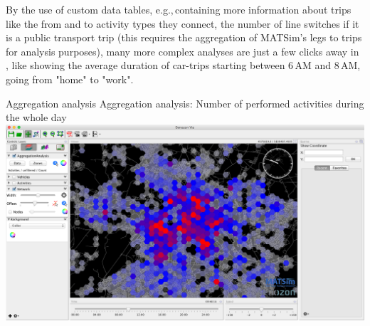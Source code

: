 By the use of custom data tables, e.g.,\,containing more information about trips
like the from and to activity types they connect, the number of line switches if
it is a public transport trip (this requires the aggregation of MATSim's legs
to trips for analysis purposes), many more complex analyses are just a few
clicks away in \Via{}, like showing the average duration of car-trips starting
between 6\,AM and 8\,AM, going from "home" to "work".

\createfigure%
{Aggregation analysis}%
{Aggregation analysis: Number of performed activities during the whole day}%
{\label{fig:via:aggregation}}%
{\includegraphics[width=1.\textwidth,angle=0]{./extending/figures/via/aggregation}}%
{}


